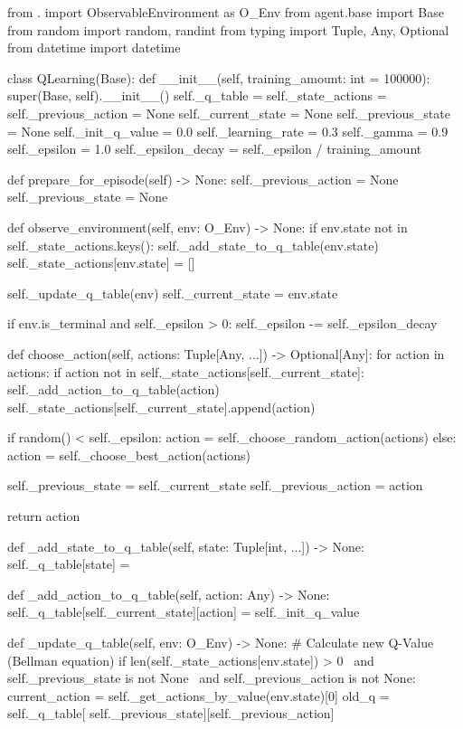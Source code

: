 \begin{python}[caption={Standardno q-učenje}, label=q_learning]
from . import ObservableEnvironment as O_Env
from agent.base import Base
from random import random, randint
from typing import Tuple, Any, Optional
from datetime import datetime


class QLearning(Base):
    def __init__(self, training_amount: int = 100000):
        super(Base, self).__init__()
        self._q_table = {}
        self._state_actions = {}
        self._previous_action = None
        self._current_state = None
        self._previous_state = None
        self._init_q_value = 0.0
        self._learning_rate = 0.3
        self._gamma = 0.9
        self._epsilon = 1.0
        self._epsilon_decay = self._epsilon / training_amount

    def prepare_for_episode(self) -> None:
        self._previous_action = None
        self._previous_state = None

    def observe_environment(self, env: O_Env) -> None:
        if env.state not in self._state_actions.keys():
            self._add_state_to_q_table(env.state)
            self._state_actions[env.state] = []

        self._update_q_table(env)
        self._current_state = env.state
		
        if env.is_terminal and self._epsilon > 0:
            self._epsilon -= self._epsilon_decay

    def choose_action(self, actions: Tuple[Any, ...]) -> Optional[Any]:
        for action in actions:
            if action not in self._state_actions[self._current_state]:
                self._add_action_to_q_table(action)
                self._state_actions[self._current_state].append(action)
		
        if random() < self._epsilon:
            action = self._choose_random_action(actions)
        else:
            action = self._choose_best_action(actions)

        self._previous_state = self._current_state
        self._previous_action = action

        return action
	
    def _add_state_to_q_table(self, state: Tuple[int, ...]) -> None:
        self._q_table[state] = {}
	
    def _add_action_to_q_table(self, action: Any) -> None:
        self._q_table[self._current_state][action] = self._init_q_value
	
    def _update_q_table(self, env: O_Env) -> None:
        # Calculate new Q-Value (Bellman equation)
        if len(self._state_actions[env.state]) > 0 \
            and self._previous_state is not None \
            and self._previous_action is not None:
                current_action = self._get_actions_by_value(env.state)[0]
                old_q = self._q_table[
                    self._previous_state][self._previous_action]
		

\end{python}
